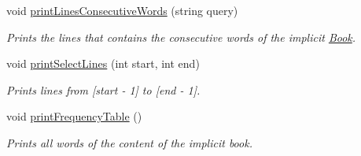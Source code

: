 \begin{DoxyCompactItemize}
void \hyperlink{class_book_ad72be3b32007023b6bb41f12276e81a3}{print\+Lines\+Consecutive\+Words} (string query)
\begin{DoxyCompactList}\small\item\em Prints the lines that contains the consecutive words of the implicit \hyperlink{class_book}{Book}. \end{DoxyCompactList}\item 
void \hyperlink{class_book_a7193030998d6251851be26196762f8e6}{print\+Select\+Lines} (int start, int end)
\begin{DoxyCompactList}\small\item\em Prints lines from \mbox{[}start -\/ 1\mbox{]} to \mbox{[}end -\/ 1\mbox{]}. \end{DoxyCompactList}\item 
void \hyperlink{class_book_ac8b57c6a725ae9afeb24e6e74d4f8fd0}{print\+Frequency\+Table} ()
\begin{DoxyCompactList}\small\item\em Prints all words of the content of the implicit book. \end{DoxyCompactList}\end{DoxyCompactItemize}
